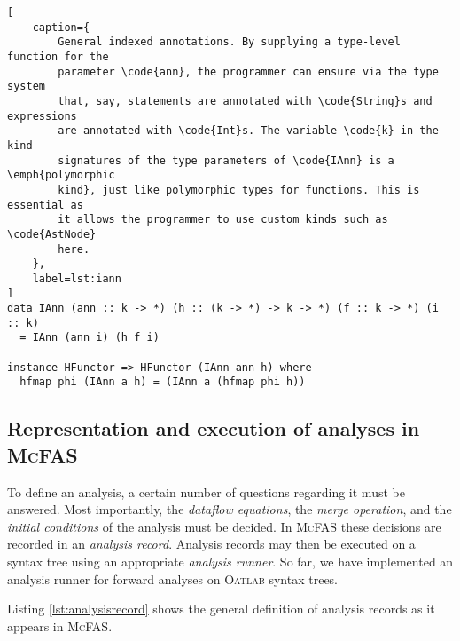 \documentclass[letterpaper,11pt]{article}
\newcommand{\mcfas}{\textsc{McFAS}}
\newcommand{\oatlab}{\textsc{Oatlab}}
\newcommand{\code}{\texttt}
\begin{document}
\begin{lstlisting}[
    caption={
        General indexed annotations. By supplying a type-level function for the
        parameter \code{ann}, the programmer can ensure via the type system
        that, say, statements are annotated with \code{String}s and expressions
        are annotated with \code{Int}s. The variable \code{k} in the kind
        signatures of the type parameters of \code{IAnn} is a \emph{polymorphic
        kind}, just like polymorphic types for functions. This is essential as
        it allows the programmer to use custom kinds such as \code{AstNode}
        here.
    },
    label=lst:iann
]
data IAnn (ann :: k -> *) (h :: (k -> *) -> k -> *) (f :: k -> *) (i :: k)
  = IAnn (ann i) (h f i)

instance HFunctor => HFunctor (IAnn ann h) where
  hfmap phi (IAnn a h) = (IAnn a (hfmap phi h))
\end{lstlisting}

\subsection{Representation and execution of analyses in \mcfas{}}
\label{sec:analysis-representation}

To define an analysis, a certain number of questions regarding it must be
answered. Most importantly, the \emph{dataflow equations}, the \emph{merge
operation}, and the \emph{initial conditions} of the analysis must be decided.
In \mcfas{} these decisions are recorded in an \emph{analysis record}. Analysis
records may then be executed on a syntax tree using an appropriate
\emph{analysis runner}. So far, we have implemented an analysis runner for
forward analyses on \oatlab{} syntax trees.

Listing \ref{lst:analysisrecord} shows the general definition of analysis
records as it appears in \mcfas.
\end{document}
